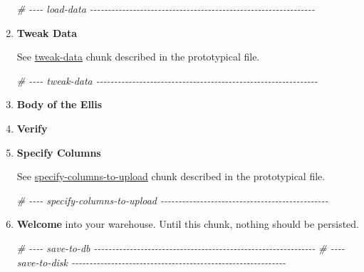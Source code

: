 \documentclass[
]{book}
\newenvironment{Shaded}{\begin{snugshade}}{\end{snugshade}}
\newcommand{\CommentTok}[1]{\textcolor[rgb]{0.56,0.35,0.01}{\textit{#1}}}
\begin{document}
\begin{enumerate}
\begin{Shaded}
\begin{Highlighting}[]
\CommentTok{\# {-}{-}{-}{-} load{-}data {-}{-}{-}{-}{-}{-}{-}{-}{-}{-}{-}{-}{-}{-}{-}{-}{-}{-}{-}{-}{-}{-}{-}{-}{-}{-}{-}{-}{-}{-}{-}{-}{-}{-}{-}{-}{-}{-}{-}{-}{-}{-}{-}{-}{-}{-}{-}{-}{-}{-}{-}{-}{-}{-}{-}{-}{-}{-}{-}{-}{-}{-}{-}}
\end{Highlighting}
\end{Shaded}
\item
  \textbf{Tweak Data}

  See \protect\hyperlink{chunk-tweak-data}{tweak-data} chunk described in the prototypical file.

\begin{Shaded}
\begin{Highlighting}[]
\CommentTok{\# {-}{-}{-}{-} tweak{-}data {-}{-}{-}{-}{-}{-}{-}{-}{-}{-}{-}{-}{-}{-}{-}{-}{-}{-}{-}{-}{-}{-}{-}{-}{-}{-}{-}{-}{-}{-}{-}{-}{-}{-}{-}{-}{-}{-}{-}{-}{-}{-}{-}{-}{-}{-}{-}{-}{-}{-}{-}{-}{-}{-}{-}{-}{-}{-}{-}{-}{-}{-}}
\end{Highlighting}
\end{Shaded}
\item
  \textbf{Body of the Ellis}
\item
  \textbf{Verify}
\item
  \textbf{Specify Columns}

  See \protect\hyperlink{chunk-specify-columns}{specify-columns-to-upload} chunk described in the prototypical file.

\begin{Shaded}
\begin{Highlighting}[]
\CommentTok{\# {-}{-}{-}{-} specify{-}columns{-}to{-}upload {-}{-}{-}{-}{-}{-}{-}{-}{-}{-}{-}{-}{-}{-}{-}{-}{-}{-}{-}{-}{-}{-}{-}{-}{-}{-}{-}{-}{-}{-}{-}{-}{-}{-}{-}{-}{-}{-}{-}{-}{-}{-}{-}{-}{-}{-}{-}}
\end{Highlighting}
\end{Shaded}
\item
  \textbf{Welcome} into your warehouse. Until this chunk, nothing should be persisted.

\begin{Shaded}
\begin{Highlighting}[]
\CommentTok{\# {-}{-}{-}{-} save{-}to{-}db {-}{-}{-}{-}{-}{-}{-}{-}{-}{-}{-}{-}{-}{-}{-}{-}{-}{-}{-}{-}{-}{-}{-}{-}{-}{-}{-}{-}{-}{-}{-}{-}{-}{-}{-}{-}{-}{-}{-}{-}{-}{-}{-}{-}{-}{-}{-}{-}{-}{-}{-}{-}{-}{-}{-}{-}{-}{-}{-}{-}{-}{-}}
\CommentTok{\# {-}{-}{-}{-} save{-}to{-}disk {-}{-}{-}{-}{-}{-}{-}{-}{-}{-}{-}{-}{-}{-}{-}{-}{-}{-}{-}{-}{-}{-}{-}{-}{-}{-}{-}{-}{-}{-}{-}{-}{-}{-}{-}{-}{-}{-}{-}{-}{-}{-}{-}{-}{-}{-}{-}{-}{-}{-}{-}{-}{-}{-}{-}{-}{-}{-}{-}{-}}
\end{Highlighting}
\end{Shaded}
\end{enumerate}
\end{document}
